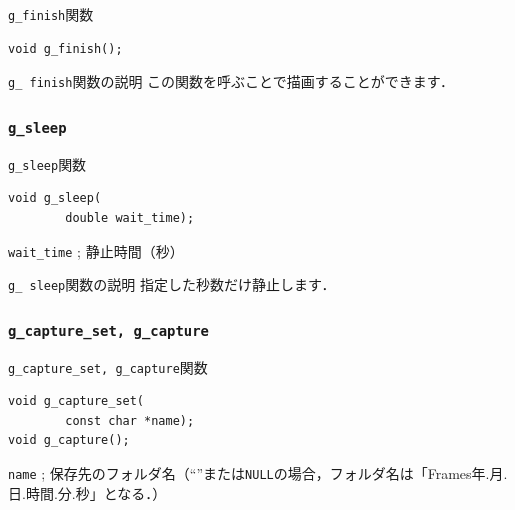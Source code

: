 \documentclass[platex,a4paper,12pt]{jsarticle}%
\begin{document}
\begin{itembox}[l]{\texttt{g\_finish}関数}
\begin{verbatim}
void g_finish();
\end{verbatim}
\end{itembox}

\begin{itembox}[l]{\texttt{g\_ finish}関数の説明}
この関数を呼ぶことで描画することができます．
\end{itembox}


\subsubsection{\texttt{g\_sleep}}

\begin{itembox}[l]{\texttt{g\_sleep}関数}
\begin{verbatim}
void g_sleep(
        double wait_time);
\end{verbatim}
\verb|wait_time| ; 静止時間（秒）\\
\end{itembox}

\begin{itembox}[l]{\texttt{g\_ sleep}関数の説明}
指定した秒数だけ静止します．
\end{itembox}




\clearpage
\subsubsection{\texttt{g\_capture\_set, g\_capture}}

\begin{itembox}[l]{\texttt{g\_capture\_set, g\_capture}関数}
\begin{verbatim}
void g_capture_set(
        const char *name);
void g_capture();
\end{verbatim}
\verb|name| ; 保存先のフォルダ名（``''または\verb|NULL|の場合，フォルダ名は「Frames年.月.日.時間.分.秒」となる．）\\
\end{itembox}
\end{document}
